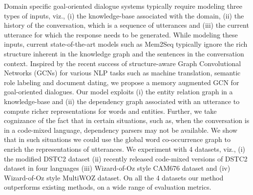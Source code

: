 Domain specific goal-oriented dialogue systems typically require modeling three types of inputs, viz., (i) the knowledge-base associated with the domain, (ii) the history of the conversation, which is a sequence of utterances and (iii) the current utterance for which the response needs to be generated. While modeling these inputs, current state-of-the-art models such as Mem2Seq typically ignore the rich structure inherent in the knowledge graph and the sentences in the conversation context. Inspired by the recent success of structure-aware Graph Convolutional Networks (GCNs) for various NLP tasks such as machine translation, semantic role labeling and document dating, we propose a memory augmented GCN for goal-oriented dialogues. Our model exploits (i) the entity relation graph in a knowledge-base and (ii) the dependency graph associated with an utterance to compute richer representations for words and entities. Further, we take cognizance of the fact that in certain situations, such as, when the conversation is in a code-mixed language, dependency parsers may not be available. We show that in such situations we could use the global word co-occurrence graph to enrich the representations of utterances. We experiment with 4 datasets, viz., (i) the modified DSTC2 dataset (ii) recently released code-mixed versions of DSTC2 dataset in four languages (iii) Wizard-of-Oz style CAM676 dataset and (iv) Wizard-of-Oz style MultiWOZ dataset. On all the 4 datasets our method outperforms existing methods, on a wide range of evaluation metrics.